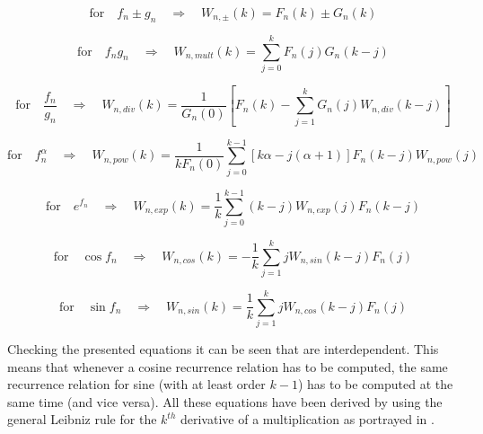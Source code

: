 \begin{equation} \label{eq:recRel1}
\text{for} \quad f_{n} \pm g_{n} \quad \Rightarrow \quad W_{n,\pm}\left(k\right)= F_{n}\left(k\right) \pm G_{n}\left(k\right)
\end{equation}

\begin{equation} \label{eq:recRel2}
\text{for} \quad f_{n}g_{n} \quad \Rightarrow \quad W_{n,mult}\left(k\right)=\displaystyle\sum_{j=0}^{k}F_{n}\left(j\right)G_{n}\left(k-j\right)
\end{equation}

\begin{equation} \label{eq:recRel3}
\text{for} \quad \dfrac{f_{n}}{g_{n}} \quad \Rightarrow \quad W_{n,div}\left(k\right)= \dfrac{1}{G_{n}\left(0\right)}\left[F_{n}\left(k\right)-\displaystyle\sum_{j=1}^{k}G_{n}\left(j\right)W_{n,div}\left(k-j\right) \right]
\end{equation}

\begin{equation} \label{eq:recRel4}
\text{for} \quad f_{n}^{\alpha} \quad \Rightarrow \quad W_{n,pow}\left(k\right)= \dfrac{1}{kF_{n}\left(0\right)} \displaystyle\sum_{j=0}^{k-1}\left[k\alpha-j\left(\alpha+1\right)\right] F_{n}\left(k-j\right)W_{n,pow}\left(j\right) 
\end{equation}

\begin{equation} \label{eq:recRel5}
\text{for} \quad e^{f_{n}} \quad \Rightarrow \quad W_{n,exp}\left(k\right)= \dfrac{1}{k}\displaystyle\sum_{j=0}^{k-1}\left(k-j\right)W_{n,exp}\left(j\right)F_{n}\left(k-j\right)
\end{equation}

\begin{equation} \label{eq:recRel6}
\text{for} \quad \cos f_{n} \quad \Rightarrow \quad W_{n,cos}\left(k\right)= -\dfrac{1}{k}\displaystyle\sum_{j=1}^{k}jW_{n,sin}\left(k-j\right)F_{n}\left(j\right)
\end{equation}

\begin{equation} \label{eq:recRel7}
\text{for} \quad \sin f_{n}  \quad \Rightarrow \quad W_{n,sin}\left(k\right)= \dfrac{1}{k}\displaystyle\sum_{j=1}^{k}jW_{n,cos}\left(k-j\right)F_{n}\left(j\right)
\end{equation}

Checking the presented equations it can be seen that  are interdependent. This means that whenever a cosine recurrence relation has to be computed, the same recurrence relation for sine (with at least order $k-1$) has to be computed at the same time (and vice versa). All these equations have been derived by \cite{jorba2005software} using the general Leibniz rule for the $k^{th}$ derivative of a multiplication as portrayed in .

